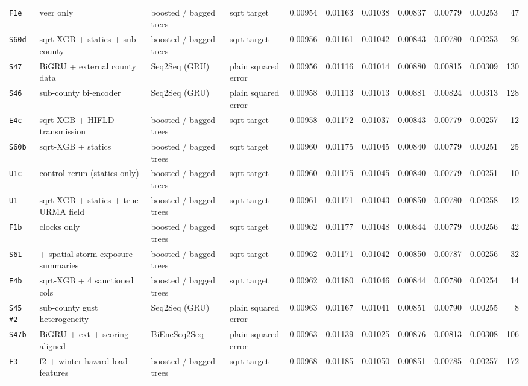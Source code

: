 \documentclass[9pt,landscape]{article}
\begin{document}
\begin{longtable}{@{}p{1.1cm}p{5.4cm}p{3.1cm}p{2.7cm}rrrrrrr@{}}
\texttt{F1e} & veer only & boosted / bagged trees & sqrt target & 0.00954 & 0.01163 & 0.01038 & 0.00837 & 0.00779 & 0.00253 & 47 \\
\texttt{S60d} & sqrt-XGB + statics + sub-county & boosted / bagged trees & sqrt target & 0.00956 & 0.01161 & 0.01042 & 0.00843 & 0.00780 & 0.00253 & 26 \\
\texttt{S47} & BiGRU + external county data & Seq2Seq (GRU) & plain squared error & 0.00956 & 0.01116 & 0.01014 & 0.00880 & 0.00815 & 0.00309 & 130 \\
\texttt{S46} & sub-county bi-encoder & Seq2Seq (GRU) & plain squared error & 0.00958 & 0.01113 & 0.01013 & 0.00881 & 0.00824 & 0.00313 & 128 \\
\texttt{E4c} & sqrt-XGB + HIFLD transmission & boosted / bagged trees & sqrt target & 0.00958 & 0.01172 & 0.01037 & 0.00843 & 0.00779 & 0.00257 & 12 \\
\texttt{S60b} & sqrt-XGB + statics & boosted / bagged trees & sqrt target & 0.00960 & 0.01175 & 0.01045 & 0.00840 & 0.00779 & 0.00251 & 25 \\
\texttt{U1c} & control rerun (statics only) & boosted / bagged trees & sqrt target & 0.00960 & 0.01175 & 0.01045 & 0.00840 & 0.00779 & 0.00251 & 10 \\
\texttt{U1} & sqrt-XGB + statics + true URMA field & boosted / bagged trees & sqrt target & 0.00961 & 0.01171 & 0.01043 & 0.00850 & 0.00780 & 0.00258 & 12 \\
\texttt{F1b} & clocks only & boosted / bagged trees & sqrt target & 0.00962 & 0.01177 & 0.01048 & 0.00844 & 0.00779 & 0.00256 & 42 \\
\texttt{S61} & + spatial storm-exposure summaries & boosted / bagged trees & sqrt target & 0.00962 & 0.01171 & 0.01042 & 0.00850 & 0.00787 & 0.00256 & 32 \\
\texttt{E4b} & sqrt-XGB + 4 sanctioned cols & boosted / bagged trees & sqrt target & 0.00962 & 0.01180 & 0.01046 & 0.00844 & 0.00780 & 0.00254 & 14 \\
\texttt{S45 \#2} & sub-county gust heterogeneity & Seq2Seq (GRU) & plain squared error & 0.00963 & 0.01167 & 0.01041 & 0.00851 & 0.00790 & 0.00255 & 8 \\
\texttt{S47b} & BiGRU + ext + scoring-aligned & BiEncSeq2Seq & plain squared error & 0.00963 & 0.01139 & 0.01025 & 0.00876 & 0.00813 & 0.00308 & 106 \\
\texttt{F3} & f2 + winter-hazard load features & boosted / bagged trees & sqrt target & 0.00968 & 0.01185 & 0.01050 & 0.00851 & 0.00785 & 0.00257 & 172 \\

\end{longtable}
\end{document}

